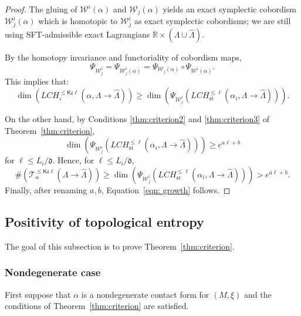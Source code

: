 \documentclass[JEP,XML,SOM,Unicode,NoFloatCountersInSection]{cedram}
\let\mathcal\mathscr
\let\epsilon\varepsilon
\let\ra\rightarrow
\newcommand{\st}{\mathrm{st}}
\theoremstyle{plain}
\theoremstyle{definition}
\numberwithin{equation}{subsection}
\begin{document}
\begin{proof}
The gluing of $\mathcal{W}^i(\alpha)$ and $\mathcal{W}_j(\alpha)$ yields an exact symplectic cobordism $\mathcal{W}^i_j(\alpha)$ which is homotopic to $\mathcal{W}^i_j$ as exact symplectic cobordisms; we are still using SFT-admissible exact Lagrangians $\mathbb{R}\times (\Lambda\cup \widehat{\Lambda})$.

By the homotopy invariance and functoriality of cobordism maps,
\begin{equation}
\Psi_{\mathcal{W}^i_j}=\Psi_{\mathcal{W}^i_j(\alpha)} = \Psi_{\mathcal{W}_j(\alpha) } \circ \Psi_{\mathcal{W}^i(\alpha)}.
\end{equation}
This implies that:
\begin{equation}
\dim (LCH^{\leq \mathsf{K} {\mathfrak c}\ell}_{\epsilon}(\alpha,\Lambda\ra \widehat{\Lambda})) \geq \dim(\Psi_{\mathcal{W}^i_j}(LCH^{\leq \ell}_{\st}(\alpha_i,\Lambda\ra \widehat{\Lambda}))).
\end{equation}

On the other hand, by Conditions \eqref{thm:criterion2} and \eqref{thm:criterion3} of Theorem~\ref{thm:criterion},
\begin{equation}%
\dim(\Psi_{\mathcal{W}^i_j}(LCH^{\leq \ell}_{\st}(\alpha_i,\Lambda\ra \widehat{\Lambda}))) \geq e^{a \ell + b}
\end{equation}
for $\ell\leq L_i/{\mathfrak d}$. Hence, for $\ell\leq L_i/{\mathfrak d}$,
\begin{equation}
\#(\mathcal{T}^{\leq \mathsf{K}{\mathfrak c}\ell}_\alpha(\Lambda\ra \widehat{\Lambda})) \geq \dim(\Psi_{\mathcal{W}^i_j}(LCH^{\leq \ell}_{\st}(\alpha_i,\Lambda\ra \widehat{\Lambda}))) > e^{a\ell + b}.
\end{equation}
Finally, after renaming $a,b$, Equation~\eqref{eqn: growth} follows.
\end{proof}

\subsection{Positivity of topological entropy}

The goal of this subsection is to prove Theorem~\ref{thm:criterion}.

\subsubsection*{Nondegenerate case} First suppose that $\alpha$ is a nondegenerate contact form for $(M,\xi)$ and the conditions of Theorem~\ref{thm:criterion} are satisfied.
\end{document}
